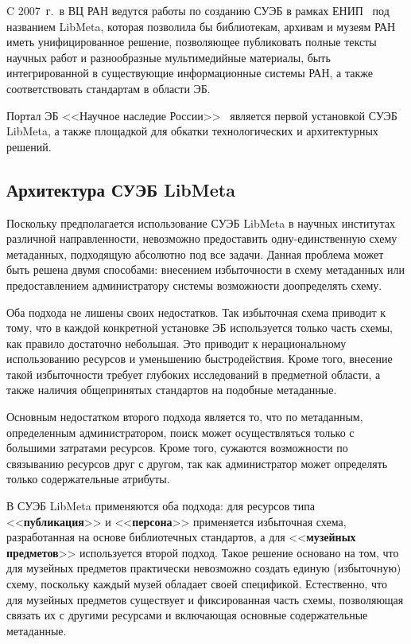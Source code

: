 \begin{multicols}{2}
  C 2007~г.\ в ВЦ РАН ведутся работы по созданию СУЭБ в рамках ЕНИП~\cite{24ser} под 
названием LibMeta, которая позволила бы библиотекам, архивам и музеям РАН иметь 
унифицированное решение, позволяющее публиковать полные тексты научных работ и 
разнообразные мультимедийные материалы, быть интегрированной в существующие 
информационные сис\-те\-мы РАН, а также соответствовать стандартам в области ЭБ.
  
  Портал ЭБ <<Научное наследие России>>~\cite{25ser} является первой установкой СУЭБ 
LibMeta, а также площадкой для обкатки технологических и архитектурных решений.


\vspace*{-6pt}

\subsection{Архитектура СУЭБ LibMeta}
  
  Поскольку предполагается использование \mbox{СУЭБ} LibMeta в научных институтах различной 
направленности, невозможно предоставить од\-ну-един\-ст\-вен\-ную схему метаданных, 
подходящую абсолютно под все задачи. Данная проблема может быть решена двумя 
способами: внесением избыточности в схему метаданных или предоставлением 
администратору системы возможности доопределять схему.
  
  Оба подхода не лишены своих недостатков. Так избыточная схема приводит к тому, что в 
каж\-дой конкретной установке ЭБ используется только часть схемы, как правило достаточно 
небольшая. Это приводит к нерациональному использованию ресурсов и уменьшению 
быстродействия. Кроме того, внесение такой избыточности требует глубоких исследований в 
предметной области, а также наличия общепринятых стандартов на подобные метаданные. 
  
  Основным недостатком второго подхода является то, что по метаданным, определенным 
администратором, поиск может осуществляться только с большими затратами ресурсов. 
Кроме того, сужа\-ют\-ся возможности по связыванию ресурсов друг с другом, так как 
администратор может определять только содержательные атрибуты.
  
  В СУЭБ LibMeta применяются оба подхода: для ресурсов типа <<\textbf{публикация}>> 
и <<\textbf{персона}>> применяется избыточная схема, разработанная на основе 
библиотечных стандартов, а для <<\textbf{музейных предметов}>> используется второй 
подход. Такое решение основано на том, что для музейных предметов практически 
невозможно создать единую (избыточную) схему, поскольку каждый музей обладает своей 
спецификой. Естественно, что для музейных предметов существует и фиксированная часть 
схемы, позволяющая связать их с другими ресурсами и включающая основные 
содержательные метаданные.


\end{multicols}

